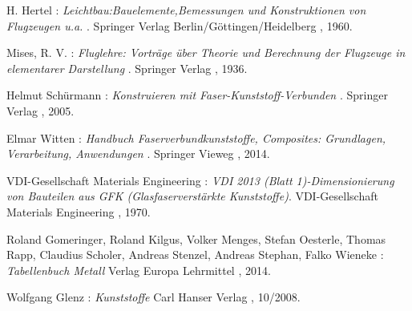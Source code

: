 \begin{thebibliography}{99}          
	H. Hertel :
	\textit { Leichtbau:Bauelemente,Bemessungen und Konstruktionen von Flugzeugen u.a. }.
	Springer Verlag Berlin/Göttingen/Heidelberg , 1960.
	
	Mises, R. V. :
	\textit { Fluglehre: Vorträge über Theorie und Berechnung der Flugzeuge in elementarer Darstellung }.
	Springer Verlag , 1936.
	
	Helmut Schürmann :
	\textit { Konstruieren mit Faser-Kunststoff-Verbunden }.
	Springer Verlag , 2005.
	
	Elmar Witten :
	\textit { Handbuch Faserverbundkunststoffe, Composites: Grundlagen, Verarbeitung, Anwendungen }.
	Springer Vieweg , 2014.
	
	VDI-Gesellschaft Materials Engineering :
	\textit{ VDI 2013 (Blatt 1)-Dimensionierung von Bauteilen aus GFK (Glasfaserverstärkte Kunststoffe)}.
	VDI-Gesellschaft Materials Engineering , 1970.
	
	Roland Gomeringer, Roland Kilgus, Volker Menges, Stefan Oesterle, Thomas Rapp, Claudius Scholer, Andreas Stenzel, Andreas Stephan, Falko Wieneke :
	\textit{ Tabellenbuch Metall}
	Verlag Europa Lehrmittel , 2014.
	
	Wolfgang Glenz :
	\textit{ Kunststoffe }
	Carl Hanser Verlag , 10/2008.
	
	





	
	
\end{thebibliography}